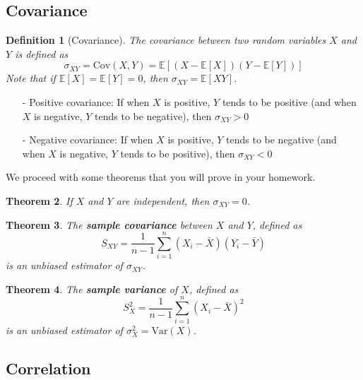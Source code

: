 \documentclass[twoside]{article}
\newcounter{lecnum}
\newtheorem{theorem}{Theorem}[lecnum]
\newtheorem{definition}[theorem]{Definition}
\theoremstyle{definition}
\begin{document}
\subsection{Covariance}

\begin{definition}[Covariance]
    The covariance between two random variables $X$ and $Y$ is defined as
    \begin{equation}
        \sigma_{XY} = \text{Cov}(X, Y) = \mathbb{E}[(X - \mathbb{E}[X])(Y - \mathbb{E}[Y])]
    \end{equation}
    Note that if $\mathbb{E}[X] = \mathbb{E}[Y] = 0$, then $\sigma_{XY} = \mathbb{E}[XY]$.
\end{definition}
\begin{itemize}
    \item[-] Positive covariance: If when $X$ is positive, $Y$ tends to be positive (and when $X$ is negative, $Y$ tends to be negative), then $\sigma_{XY} > 0$
    \item[-] Negative covariance: If when $X$ is positive, $Y$ tends to be negative (and when $X$ is negative, $Y$ tends to be positive), then $\sigma_{XY} < 0$
\end{itemize}
We proceed with some theorems that you will prove in your homework.
\begin{theorem}
    If $X$ and $Y$ are independent, then $\sigma_{XY} = 0$.
\end{theorem}
\begin{theorem}
    The \textbf{sample covariance} between $X$ and $Y$, defined as
    \begin{equation}
        S_{XY} = \frac{1}{n-1} \sum_{i=1}^n (X_i - \bar{X})(Y_i - \bar{Y})
    \end{equation}
    is an unbiased estimator of $\sigma_{XY}$.
\end{theorem}
\begin{theorem}
    The \textbf{sample variance} of $X$, defined as 
    \begin{equation}
        S_X^2 = \frac{1}{n-1} \sum_{i=1}^n (X_i - \bar{X})^2
    \end{equation}
    is an unbiased estimator of $\sigma_X^2 = \text{Var}(X)$.
\end{theorem}

\subsection{Correlation}
\end{document}
